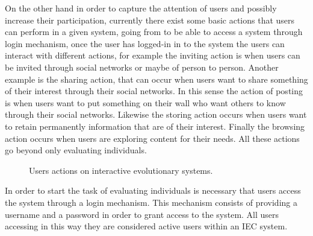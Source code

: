 On the other hand in order to capture the attention of users and possibly
increase their participation, currently there exist some basic actions that
users can perform in a given system, going from to be able to access a system
through login mechanism, once the user has logged-in in to the system the
users can interact with different actions, for example the inviting action is
when users can be invited through social networks or maybe of person to
person. Another example is the sharing action, that can occur when users want
to share something of their interest through their social networks. In this sense the action of posting is when
users want to put something on their wall who want others to know through
their social networks. Likewise the storing action occurs when users want to
retain permanently information that are of their interest. Finally the
browsing action occurs when users are exploring content for their needs. All
these actions go beyond only evaluating individuals.

\begin{figure}
	\captionsetup{justification=centering,margin=2cm}
	\centering
	\setlength\fboxsep{0pt}
	\setlength\fboxrule{0.7pt}
	\caption{Users actions on interactive evolutionary systems.}
	\label{fig:users}
\end{figure}

In order to start the task of evaluating individuals is necessary that users
access the system through a login mechanism. This mechanism consists of
providing a username and a password in order to grant access to the system. All
users accessing in this way they are considered active users within an IEC
system.

